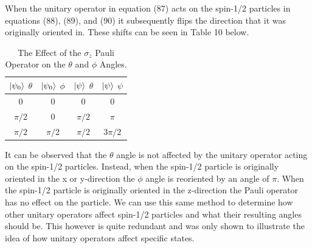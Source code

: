 \documentclass[twocolumn]{article}
\begin{document}
When the unitary operator in equation (87) acts on the spin-1/2 particles in equations (88), (89), and (90) it subsequently flips the direction that it was originally oriented in. These shifts can be seen in Table 10 below.
\begin{table}[h!]
\begin{center}
\begin{tabular}{ |c|c|c|c| }
\hline $\ket{\psi_0}$ $\theta$& $\ket{\psi_0}$ $\phi$& $\ket{\psi}$ $\theta$& $\ket{\psi}$ $\psi$ \\
\hline 0 & 0 & 0 & 0 \\
\hline $\pi/2$ & 0 & $\pi/2$ & $\pi$ \\
\hline $\pi/2$ & $\pi/2$ & $\pi/2$ & $3\pi/2$ \\
\hline
\end{tabular}
\caption{The Effect of the $\sigma_z$ Pauli Operator on the $\theta$ and $\phi$ Angles.}
\end{center}
\end{table} 
\newpage
It can be observed that the $\theta$ angle is not affected by the unitary operator acting on the spin-1/2 particles. Instead, when the spin-1/2 particle is originally oriented in the x or y-direction the $\phi$ angle is reoriented by an angle of $\pi$. When the spin-1/2 particle is originally oriented in the z-direction the Pauli operator has no effect on the particle. We can use this same method to determine how other unitary operators affect spin-1/2 particles and what their resulting angles should be. This however is quite redundant and was only shown to illustrate the idea of how unitary operators affect specific states.
\end{document}
